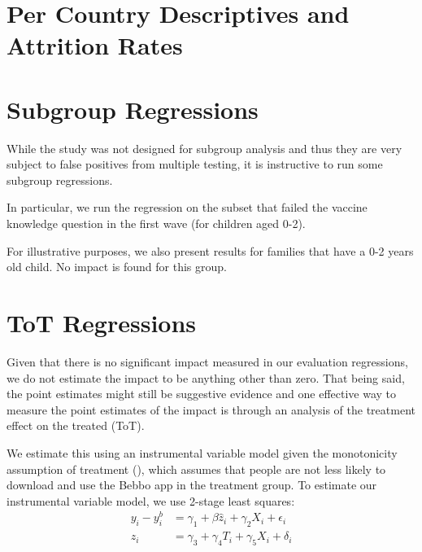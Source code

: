 \documentclass{article}
\begin{document}
\section{Per Country Descriptives and Attrition Rates}








\section{Subgroup Regressions}

While the study was not designed for subgroup analysis and thus they are very subject to false positives from multiple testing, it is instructive to run some subgroup regressions.

In particular, we run the regression on the subset that failed the vaccine knowledge question in the first wave (for children aged 0-2).



For illustrative purposes, we also present results for families that have a 0-2 years old child. No impact is found for this group.





\section{ToT Regressions}

Given that there is no significant impact measured in our evaluation regressions, we do not estimate the impact to be anything other than zero. That being said, the point estimates might still be suggestive evidence and one effective way to measure the point estimates of the impact is through an analysis of the treatment effect on the treated (ToT).

We estimate this using an instrumental variable model given the monotonicity assumption of treatment (\cite{Imbens2015}), which assumes that people are not less likely to download and use the Bebbo app in the treatment group. To estimate our instrumental variable model, we use 2-stage least squares:
\begin{align*}
y_{i} - y^{b}_i &= \gamma_1 + \beta \hat{z}_{i} + \gamma_2X_{i} + \epsilon_i \\
z_{i} &= \gamma_3 + \gamma_4 T_{i} + \gamma_5X_{i} + \delta_i
\end{align*}
\end{document}
